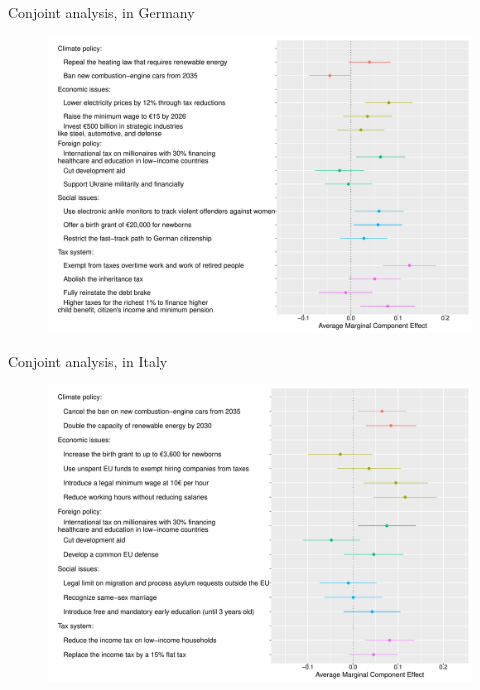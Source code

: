 \documentclass[aspectratio=169,xcolor=dvipsnames, 11pt,mathserif]{beamer}
\begin{document}
\begin{frame}{Conjoint analysis,  in Germany\label{conjoint_countries} \hyperlink{conjoint_country}{}} 
    \begin{figure} \vspace{-.14cm}
\includegraphics[height=.97\textheight]{../figures/all/conjoint_EN-DE.pdf}
\end{figure}
\end{frame}

\begin{frame}{Conjoint analysis,  in Italy\label{conjoint_countries} \hyperlink{conjoint_country}{}} 
    \begin{figure} \vspace{-.14cm}
\includegraphics[height=.97\textheight]{../figures/all/conjoint_EN-IT.pdf}
\end{figure}
\end{frame}
\end{document}
